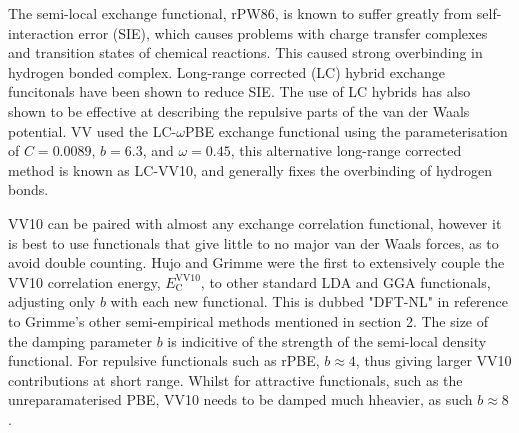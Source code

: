 \documentclass[10pt,a4paper,twocolumn,twoside]{extarticle}
\begin{document}
	The semi-local exchange functional, rPW86, is known to suffer greatly from self-interaction error (SIE), which causes problems with charge transfer complexes and transition states of chemical reactions. This caused strong overbinding in hydrogen bonded complex.\cite{Vydrov2012} Long-range corrected (LC) hybrid exchange funcitonals have been shown to reduce SIE. \cite{vydrov2006-LC-Hybrids} The use of LC hybrids has also shown to be effective at describing the repulsive parts of the van der Waals potential. \cite{sato2007-LC-Hybrids} VV used the LC-$\omega$PBE exchange functional using the parameterisation of $C = 0.0089$, $b = 6.3$, and $\omega = 0.45$, this alternative long-range corrected method is known as LC-VV10, and generally fixes the overbinding of hydrogen bonds.

	VV10 can be paired with almost any exchange correlation functional, however it is best to use functionals that give little to no major van der Waals forces, as to avoid double counting.
	Hujo and Grimme were the first to extensively couple the VV10 correlation energy, $E_\text{C}^\text{VV10}$, to other standard LDA and GGA functionals, adjusting only $b$ with each new functional.\cite{Grimme2011-VV10-LDA-GGA-Pairing} This is dubbed "DFT-NL" in reference to Grimme's other semi-empirical methods mentioned in section 2. The size of the damping parameter $b$ is indicitive of the strength of the semi-local density functional. For repulsive functionals such as rPBE, $b \approx 4$, thus giving larger VV10 contributions at short range. Whilst for attractive functionals, such as the unreparamaterised PBE, VV10 needs to be damped much hheavier, as such $b \approx 8$.\cite{Grimme2011}
	


\end{document}
